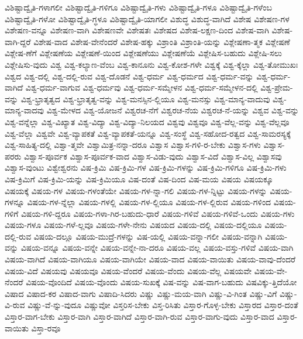 {ವಿಶಿಷ್ಟಾದ್ವೈತಿ-ಗಳಾಗಲೀ
ವಿಶಿಷ್ಟಾದ್ವೈತಿ-ಗಳಿಗೂ
ವಿಶಿಷ್ಟಾದ್ವೈತಿ-ಗಳು
ವಿಶಿಷ್ಟಾದ್ವೈತಿ-ಗಳೂ
ವಿಶಿಷ್ಟಾದ್ವೈತಿ-ಗಳೆಂಬ
ವಿಶಿಷ್ಟಾದ್ವೈತಿ-ಗಳೋ
ವಿಶಿಷ್ಟಾದ್ವೈತಿ-ಗ್ಧಳೂ
ವಿಶಿಷ್ಟಾದ್ವೈತಿ-ಯಾಗಲೀ
ವಿಶುದ್ಧ
ವಿಶುದ್ಧ-ವಾಗಿದೆ
ವಿಶೇಷ
ವಿಶೇಷಣ-ಗಳ
ವಿಶೇಷಣ-ವನ್ನೂ
ವಿಶೇಷಣ-ವಾಗಿ
ವಿಶೇಷಣವೇ
ವಿಶೇಷತಃ
ವಿಶೇಷದ
ವಿಶೇಷ-ಲಕ್ಷಣ-ದಿಂದ
ವಿಶೇಷ-ವಾಗಿ
ವಿಶೇಷ-ವಾಗಿ-ದ್ದರೆ
ವಿಶೇಷ-ವಾದ
ವಿಶೇಷ-ವೇನೆಂದರೆ
ವಿಶೇಷ-ಹಕ್ಕು
ವಿಶ್ರಾಂತಿ
ವಿಶ್ರಾಂತಿ-ಯನ್ನು
ವಿಶ್ಲೇಷಣಾ-ತ್ಮಕ
ವಿಶ್ಲೇಷಣೆ
ವಿಶ್ಲೇಷ-ಣೆಗೆ
ವಿಶ್ಲೇಷಣೆಯ
ವಿಶ್ಲೇಷಣೆ-ಯಿಂದ
ವಿಶ್ಲೇಷಣೆಯು
ವಿಶ್ಲೇಷಣೆಯೆ
ವಿಶ್ಲೇಷಿಸ-ಬಹುದು
ವಿಶ್ಲೇಷಿ-ಸಲು
ವಿಶ್ಲೇಷಿಸು-ವುದು
ವಿಶ್ವ
ವಿಶ್ವ-ಕಲ್ಯಾಣ-ವೆಂಬ
ವಿಶ್ವ-ಕಾನೂನು
ವಿಶ್ವ-ಕೋಶ-ಗಳೇ
ವಿಶ್ವಕ್ಕೆ
ವಿಶ್ವ-ಕ್ಕೆಲ್ಲಾ
ವಿಶ್ವ-ತೋಮುಖಃ
ವಿಶ್ವದ
ವಿಶ್ವ-ದಲ್ಲಿ
ವಿಶ್ವ-ದಲ್ಲಿ-ರುವ
ವಿಶ್ವ-ದೊಡನೆ
ವಿಶ್ವ-ಧರ್ಮ
ವಿಶ್ವ-ಧರ್ಮದ
ವಿಶ್ವ-ಧರ್ಮ-ವನ್ನು
ವಿಶ್ವ-ಧರ್ಮ-ವಾಗಿದೆ
ವಿಶ್ವ-ಧರ್ಮ-ವಾಗುವ
ವಿಶ್ವ-ಧರ್ಮವು
ವಿಶ್ವ-ಧರ್ಮ-ಸಮ್ಮೇಳನ
ವಿಶ್ವ-ಧರ್ಮ-ಸಮ್ಮೇಳನ-ದಲ್ಲಿ
ವಿಶ್ವ-ಪ್ರೇಮ-ವನ್ನು
ವಿಶ್ವ-ಭ್ರಾತೃತ್ವದ
ವಿಶ್ವ-ಭ್ರಾತೃತ್ವ-ವನ್ನು
ವಿಶ್ವ-ಮನಸ್ಸಿನ-ಲ್ಲಿಯೂ
ವಿಶ್ವ-ಮನಸ್ಸು
ವಿಶ್ವ-ಮಾನ್ಯ-ವಾದುವು
ವಿಶ್ವ-ಮಾನ್ಯ-ವಾದವು
ವಿಶ್ವ-ಮೇಳದ
ವಿಶ್ವ-ಯೋಜನೆ
ವಿಶ್ವರಚ-ನೆಗೆ
ವಿಶ್ವರಚ-ನೆಯ
ವಿಶ್ವರಚ-ನೆ-ಯನ್ನು
ವಿಶ್ವವ
ವಿಶ್ವ-ವನ್ನು
ವಿಶ್ವ-ವನ್ನೆಲ್ಲಾ
ವಿಶ್ವ-ವಿಖ್ಯಾತ
ವಿಶ್ವ-ವಿದ್ಯಾ
ವಿಶ್ವ-ವಿದ್ಯಾ-ನಿಲಯದ
ವಿಶ್ವವು
ವಿಶ್ವವೂ
ವಿಶ್ವ-ವೆಲ್ಲ-ವನ್ನು
ವಿಶ್ವ-ವೆಲ್ಲವೂ
ವಿಶ್ವ-ವೆಲ್ಲಾ
ವಿಶ್ವವೇ
ವಿಶ್ವ-ವ್ಯಾಪಕತೆ
ವಿಶ್ವ-ವ್ಯಾಪಕತೆ-ಯನ್ನೂ
ವಿಶ್ವ-ಸಂಸ್ಥೆ
ವಿಶ್ವ-ಸಹೋದ-ರತ್ವದ
ವಿಶ್ವ-ಸಾಮರಸ್ಯಕ್ಕೆ
ವಿಶ್ವ-ಸಾಹಿತ್ಯ-ದಲ್ಲಿ
ವಿಶ್ವಾ-ತ್ಮವೇ
ವಿಶ್ವಾಮಿತ್ರ-ನನ್ನಾ-ದರೂ
ವಿಶ್ವಾಸ
ವಿಶ್ವಾಸ-ಗಳಿ-ರ-ಬೇಕು
ವಿಶ್ವಾಸ-ಗಳು
ವಿಶ್ವಾಸ-ಪರರು
ವಿಶ್ವಾಸ-ಪೂರ್ವಕ
ವಿಶ್ವಾಸ-ಪೂರ್ವಕ-ವಾದ
ವಿಶ್ವಾಸ-ವಿಡು-ವುದು
ವಿಶ್ವಾಸ-ವಿದೆ
ವಿಶ್ವಾಸ-ವಿಲ್ಲ
ವಿಶ್ವಾಸವು
ವಿಶ್ವಾಸ-ವುಂಟು
ವಿಶ್ವೇಶ್ವರನು
ವಿಷ-ಕ್ರಿಮಿ
ವಿಷ-ಕ್ರಿಮಿ-ಗಳ
ವಿಷ-ಕ್ರಿಮಿ-ಗಳನ್ನು
ವಿಷ-ಕ್ರಿಮಿ-ಗಳಿಗೂ
ವಿಷ-ಕ್ರಿಮಿ-ಗಳು
ವಿಷ-ಕ್ರಿಮಿಗೆ
ವಿಷ-ಕ್ರಿಮಿ-ಯನ್ನು
ವಿಷ-ಕ್ರಿಮಿಯೂ
ವಿಷ-ದಂತೆ
ವಿಷ-ದಿಂದ
ವಿಷ-ಮಯ
ವಿಷಯ
ವಿಷಯಕ್ಕೂ
ವಿಷಯಕ್ಕೆ
ವಿಷಯ-ಗಳ
ವಿಷಯ-ಗಳಂತೆಯೇ
ವಿಷಯ-ಗಳ-ನ್ನಾ-ಗಲಿ
ವಿಷಯ-ಗಳ-ನ್ನಿಟ್ಟು
ವಿಷಯ-ಗಳನ್ನು
ವಿಷಯ-ಗಳನ್ನೂ
ವಿಷಯ-ಗಳ-ನ್ನೆಲ್ಲಾ
ವಿಷಯ-ಗಳಲ್ಲಿ
ವಿಷಯ-ಗಳ-ಲ್ಲಿಯೂ
ವಿಷಯ-ಗಳ-ಲ್ಲಿರುವ
ವಿಷಯ-ಗಳಿಂದ
ವಿಷಯ-ಗಳಿಗೆ
ವಿಷಯ-ಗಳಿ-ದ್ದರೂ
ವಿಷಯ-ಗಳಾ-ಗಿರ-ಬಹುದು-ಧಾರೆ
ವಿಷಯ-ಗಳಿವೆ
ವಿಷಯ-ಗಳಿವೆ-ಒಂದು
ವಿಷಯ-ಗಳು
ವಿಷಯ-ಗಳೂ
ವಿಷಯ-ಗಳೆ-ಲ್ಲವೂ
ವಿಷಯ-ಗಳೇ-ನೇನು
ವಿಷಯದ
ವಿಷಯ-ದಲ್ಲಿ
ವಿಷಯ-ದಲ್ಲಿಯೂ
ವಿಷಯ-ದಲ್ಲಿ-ರುವ
ವಿಷಯ-ದಲ್ಲೂ
ವಿಷಯ-ಮುದ್ರೆ-ಗಳನ್ನು
ವಿಷ-ಯಲ್ಲಿ
ವಿಷಯ-ವನ್ನಾ-ಗಲೀ
ವಿಷಯ-ವನ್ನಾಗಿ
ವಿಷಯ-ವನ್ನು
ವಿಷಯ-ವನ್ನೂ
ವಿಷಯ-ವನ್ನೇ
ವಿಷಯ-ವನ್ನೇ-ನಾ-ದರೂ
ವಿಷಯ-ವಲ್ಲ
ವಿಷಯ-ವಸ್ತು-ಗಳಿವೆ
ವಿಷಯ-ವಾಗಿ
ವಿಷಯ-ವಾಗಿದೆ
ವಿಷಯ-ವಾಗಿಯೂ
ವಿಷಯ-ವಾಗಿಯೇ
ವಿಷಯ-ವಾದ
ವಿಷಯ-ವಾಯಿತು
ವಿಷಯ-ವಾವು-ದೆಂದರೆ
ವಿಷಯ-ವಿದೆ
ವಿಷಯವು
ವಿಷಯವೂ
ವಿಷಯ-ವೆಂದರೆ
ವಿಷಯ-ವೆಂದು
ವಿಷಯ-ವೆಲ್ಲ
ವಿಷಯವೇ
ವಿಷಯ-ವೇ-ನೆಂದರೆ
ವಿಷಯ-ವೊಂದಿದೆ
ವಿಷಯ-ವೊಂದು
ವಿಷಯ-ಸುಖಕ್ಕೆ
ವಿಷ-ವನ್ನು
ವಿಷ-ವಾಗ-ಬಹುದು
ವಿಷವಿಕ್ಕು-ತ್ತಿದೆಯೋ
ವಿಷಾದ
ವಿಷಾದ-ಕರ
ವಿಷಾದ-ವಾಗು
ವಿಷಾದಿ-ಸಿದರು
ವಿಷ್ಣು
ವಿಷ್ಣು-ಮಯ-ವಾಗಿ
ವಿಷ್ಣು-ವಿ-ಗಿಂತ
ವಿಷ್ಣು-ವಿಗೆ
ವಿಷ್ಣು-ವಿ-ರುವ
ವಿಷ್ಣು-ವೆ-ನ್ನು-ವುದೂ
ವಿಷ್ಣುವೋ
ವಿಸ್ತರಿಸ-ಬೇಕು
ವಿಸ್ತ-ರಿಸಿತು
ವಿಸ್ತಾರ-ಗೊಳ್ಳ-ಬೇಕು
ವಿಸ್ತಾರದ
ವಿಸ್ತಾರ-ದಂತೆ
ವಿಸ್ತಾರ-ವಾಗ-ಬೇಕು
ವಿಸ್ತಾರ-ವಾಗಿ
ವಿಸ್ತಾರ-ವಾಗಿದೆ
ವಿಸ್ತಾರ-ವಾಗಿ-ರುವ
ವಿಸ್ತಾರ-ವಾಗು-ವುದು
ವಿಸ್ತಾರ-ವಾದ
ವಿಸ್ತಾರ-ವಾಯಿತು
ವಿಸ್ತಾ-ರವೂ
}
